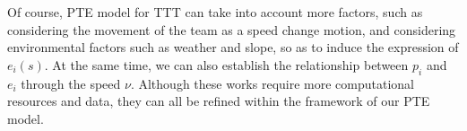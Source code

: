 \par Of course, PTE model for TTT can take into account more factors, such as considering the movement of the team as a speed change motion, and considering environmental factors such as weather and slope, so as to induce the expression of $e_i(s)$. At the same time, we can also establish the relationship between $p_i$ and $e_i$ through the speed $\nu$. Although these works require more computational resources and data, they can all be refined within the framework of our PTE model.
